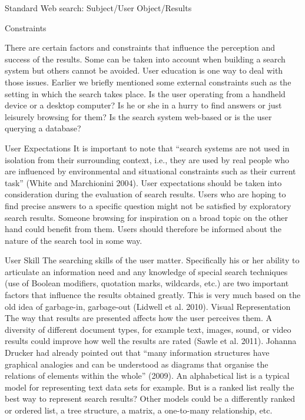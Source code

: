 Standard Web search:  Subject/User  Object/Results

Constraints

There are certain factors and constraints that influence the perception and success of the results. Some can be taken into account when building a search system but others cannot be avoided. User education is one way to deal with those issues. Earlier we briefly mentioned some external constraints such as the setting in which the search takes place. Is the user operating from a handheld device or a desktop computer? Is he or she in a hurry to find answers or just leisurely browsing for them? Is the search system web-based or is the user querying a database?

User Expectations  It is important to note that ``search systems are not used in isolation from their surrounding context, i.e., they are used by real people who are influenced by environmental and situational constraints such as their current task'' (White and Marchionini 2004). User expectations should be taken into consideration during the evaluation of search results. Users who are hoping to find precise answers to a specific question might not be satisfied by exploratory search results. Someone browsing for inspiration on a broad topic on the other hand could benefit from them. Users should therefore be informed about the nature of the search tool in some way.

User Skill   The searching skills of the user matter. Specifically his or her ability to articulate an information need and any knowledge of special search techniques (use of Boolean modifiers, quotation marks, wildcards, etc.) are two important factors that influence the results obtained greatly. This is very much based on the old idea of garbage-in, garbage-out (Lidwell et al. 2010).
Visual Representation   The way that results are presented affects how the user perceives them. A diversity of different document types, for example text, images, sound, or video results could improve how well the results are rated (Sawle et al. 2011). Johanna Drucker had already pointed out that ``many information structures have graphical analogies and can be understood as diagrams that organise the relations of elements within the whole'' (2009). An alphabetical list is a typical model for representing text data sets for example. But is a ranked list really the best way to represent search results? Other models could be a differently ranked or ordered list, a tree structure, a matrix, a one-to-many relationship, etc.

